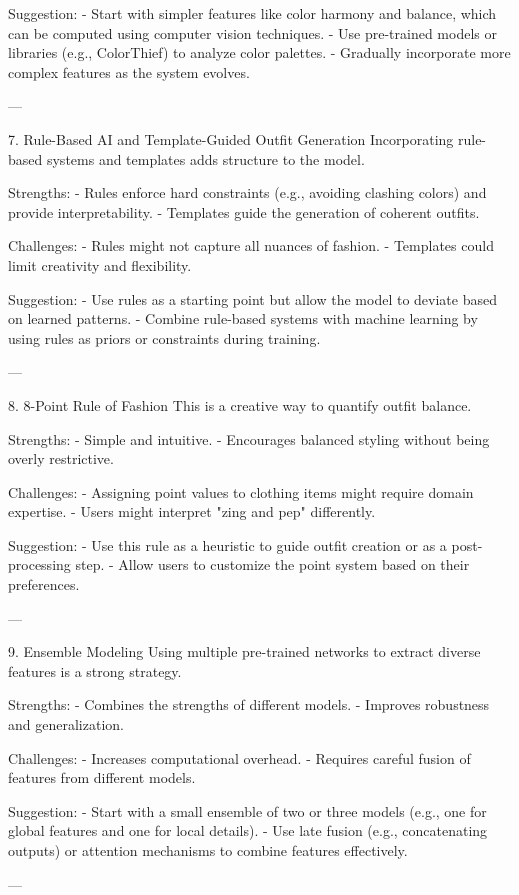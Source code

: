 Suggestion:
- Start with simpler features like color harmony and balance, which can be computed using computer vision techniques.
- Use pre-trained models or libraries (e.g., ColorThief) to analyze color palettes.
- Gradually incorporate more complex features as the system evolves.

---

7. Rule-Based AI and Template-Guided Outfit Generation
Incorporating rule-based systems and templates adds structure to the model.

Strengths:
- Rules enforce hard constraints (e.g., avoiding clashing colors) and provide interpretability.
- Templates guide the generation of coherent outfits.

Challenges:
- Rules might not capture all nuances of fashion.
- Templates could limit creativity and flexibility.

Suggestion:
- Use rules as a starting point but allow the model to deviate based on learned patterns.
- Combine rule-based systems with machine learning by using rules as priors or constraints during training.

---

8. 8-Point Rule of Fashion
This is a creative way to quantify outfit balance.

Strengths:
- Simple and intuitive.
- Encourages balanced styling without being overly restrictive.

Challenges:
- Assigning point values to clothing items might require domain expertise.
- Users might interpret "zing and pep" differently.

Suggestion:
- Use this rule as a heuristic to guide outfit creation or as a post-processing step.
- Allow users to customize the point system based on their preferences.

---

9. Ensemble Modeling
Using multiple pre-trained networks to extract diverse features is a strong strategy.

Strengths:
- Combines the strengths of different models.
- Improves robustness and generalization.

Challenges:
- Increases computational overhead.
- Requires careful fusion of features from different models.

Suggestion:
- Start with a small ensemble of two or three models (e.g., one for global features and one for local details).
- Use late fusion (e.g., concatenating outputs) or attention mechanisms to combine features effectively.

---

